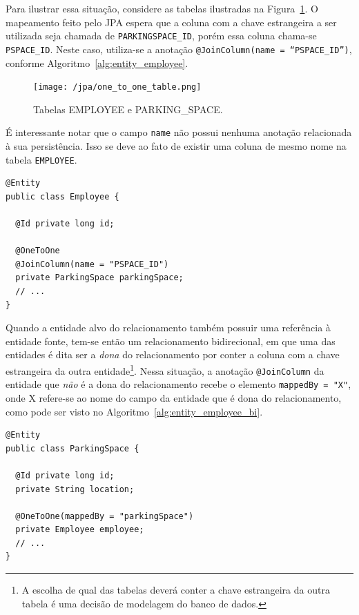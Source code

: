 \documentclass[
  10.5pt,				  %
	openright,			%
	twoside,			  %
  a5paper,
  chapter=TITLE,	%
	section=TITLE,	%
  hyphens,        %
	english,        %
	brazil          %
]{abntex2}
\begin{document}
Para ilustrar essa situação, considere as tabelas ilustradas na Figura~\ref{fig:jpa_onetoone}. O mapeamento feito pelo JPA espera que a coluna com a chave estrangeira a ser utilizada seja chamada de \texttt{PARKINGSPACE\_ID}, porém essa coluna chama-se \texttt{PSPACE\_ID}. Neste caso, utiliza-se a anotação \texttt{@JoinColumn(name = ``PSPACE\_ID'')}, conforme Algoritmo~\ref{alg:entity_employee}.



\begin{figure}[!ht]
  \caption{\label{fig:jpa_onetoone} Tabelas EMPLOYEE e PARKING\_SPACE.}
  \begin{center}
    \texttt{[image: /jpa/one\_to\_one\_table.png]}
  \end{center}
\end{figure}

É interessante notar que o campo \texttt{name} não possui nenhuma anotação relacionada à sua persistência. Isso se deve ao fato de existir uma coluna de mesmo nome na tabela \texttt{EMPLOYEE}.

\begin{lstlisting}[caption={Classe Employee e seus relacionamentos.}, label={alg:entity_employee}]
@Entity
public class Employee {

  @Id private long id;
  
  @OneToOne
  @JoinColumn(name = "PSPACE_ID")
  private ParkingSpace parkingSpace;
  // ...
}
\end{lstlisting}


Quando a entidade alvo do relacionamento também possuir uma referência à entidade fonte, tem-se então um relacionamento bidirecional, em que uma das entidades é dita ser a \emph{dona} do relacionamento por conter a coluna com a chave estrangeira da outra entidade\footnote{A escolha de qual das tabelas deverá conter a chave estrangeira da outra tabela é uma decisão de modelagem do banco de dados.}. Nessa situação, a anotação \texttt{@JoinColumn} da entidade que \emph{não} é a dona do relacionamento recebe o elemento \texttt{mappedBy = "X"}, onde X refere-se ao nome do campo da entidade que é dona do relacionamento, como pode ser visto no Algoritmo~\ref{alg:entity_employee_bi}.

\begin{lstlisting}[caption={Classe ParkingSpace e seus relacionamentos.}, label={alg:entity_employee_bi}]
@Entity
public class ParkingSpace {
  
  @Id private long id;
  private String location;

  @OneToOne(mappedBy = "parkingSpace")
  private Employee employee;
  // ...
}
\end{lstlisting}
%
\end{document}
